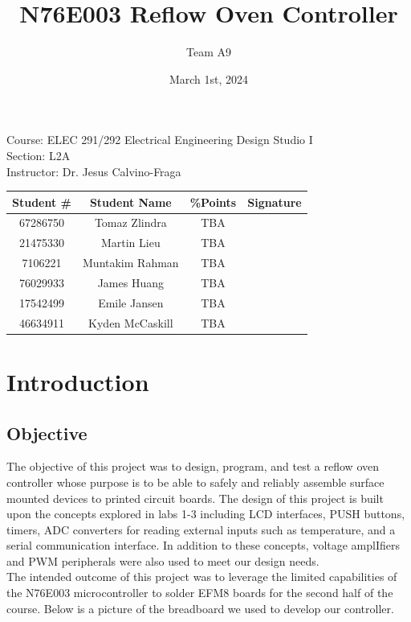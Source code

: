 \documentclass{article}
\title{N76E003 Reflow Oven Controller}
\author{Team A9}
\date{March 1st, 2024}
\begin{document}
\maketitle
\begin{center}
Course: ELEC 291/292 Electrical Engineering Design Studio I \\
Section: L2A \\
Instructor: Dr. Jesus Calvino-Fraga \\
\end{center}

\begin{tabular}{|c|c|c|c|}
  \hline
  Student \# & Student Name & \%Points & Signature \\
  \hline
  67286750 & Tomaz Zlindra & TBA &  \\
  \hline
  21475330 & Martin Lieu & TBA &  \\
  \hline
  7106221 & Muntakim Rahman & TBA &  \\
  \hline
  76029933 & James Huang & TBA & \\
  \hline
  17542499 & Emile Jansen  & TBA & \\
  \hline
  46634911 & Kyden McCaskill & TBA & \\
  \hline
\end{tabular}

\newpage

\tableofcontents

\newpage
\section{Introduction}

\subsection{Objective}

The objective of this project was to design, program, and test a reflow oven controller whose purpose is to be able to safely and reliably  assemble surface mounted devices to printed circuit boards. The design of this project is built upon the concepts explored in labs 1-3 including LCD interfaces, PUSH buttons, timers, ADC converters for reading external inputs such as temperature, and a serial communication interface. In addition to these concepts,  voltage amplIfiers and PWM peripherals were also used to meet our design needs.  \\

\noindent The intended outcome of this project was to leverage the limited capabilities of the N76E003 microcontroller to solder EFM8 boards for the second half of the course. Below is a picture of the breadboard we used to develop our controller.
\end{document}
